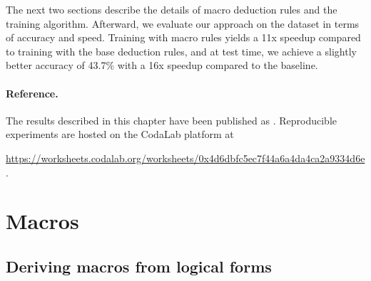 The next two sections describe the details of
macro deduction rules and the training algorithm.
Afterward, we evaluate our approach on the \wtq dataset
in terms of accuracy and speed.
Training with macro rules yields a 11x speedup
compared to training with the base deduction rules,
and at test time,
we achieve a slightly better accuracy of 43.7\%
with a 16x speedup compared to the baseline.

\paragraph{Reference.}
The results described in this chapter have been published as
\citet{zhang2017macro}.
Reproducible experiments are hosted on the
CodaLab platform at
\begin{center}
\small
\url{https://worksheets.codalab.org/worksheets/0x4d6dbfc5ec7f44a6a4da4ca2a9334d6e}.
\end{center}

\section{Macros}

\subsection{Deriving macros from logical forms}

